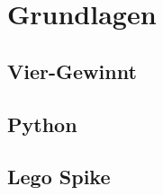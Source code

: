 \chapter{Grundlagen}
\label{cha:Grundlagen}
%
%

\section{Vier-Gewinnt}
\section{Python}
\section{Lego Spike}


